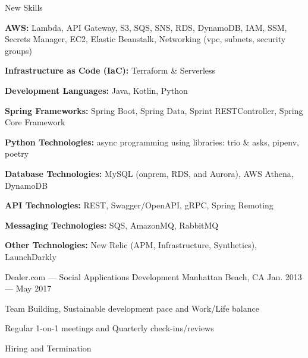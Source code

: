 \vspace{-2.00mm}
\begin{cventries}

\cventry
    {New Skills} %
    {} %
    {} %
    {} %
    {%
      \begin{cvitems} %
        \item {\textbf{AWS:} Lambda, API Gateway, S3, SQS, SNS, RDS, DynamoDB, IAM, SSM, Secrets Manager, EC2, Elastic Beanstalk, Networking (vpc, subnets, security groups)}
        \item {\textbf{Infrastructure as Code (IaC):} Terraform \& Serverless}
        \item {\textbf{Development Languages:} Java, Kotlin, Python}
        \item {\textbf{Spring Frameworks:} Spring Boot, Spring Data, Sprint RESTController, Spring Core Framework}
        \item {\textbf{Python Technologies:} async programming using libraries: trio \& asks, pipenv, poetry}
        \item {\textbf{Database Technologies:} MySQL (onprem, RDS, and Aurora), AWS Athena, DynamoDB}
        \item {\textbf{API Technologies:} REST, Swagger/OpenAPI, gRPC, Spring Remoting}
        \item {\textbf{Messaging Technologies:} SQS, AmazonMQ, RabbitMQ}
        \item {\textbf{Other Technologies:} New Relic (APM, Infrastructure, Synthetics), LaunchDarkly}
      \end{cvitems}
    }


    {Dealer.com --- Social Applications Development} %
    {Manhattan Beach, CA} %
    {Jan. 2013 --- May 2017} %
    {}
    \vspace{-4.00mm}

    {} %
    {} %
    {} %
    {\vspace{-0.5mm}
      \begin{cvitems} %
        \item {Team Building, Sustainable development pace and Work/Life balance}
        \item {Regular 1-on-1 meetings and Quarterly check-ins/reviews}
        \item {Hiring and Termination}
      \end{cvitems}
    }


\end{cventries}
